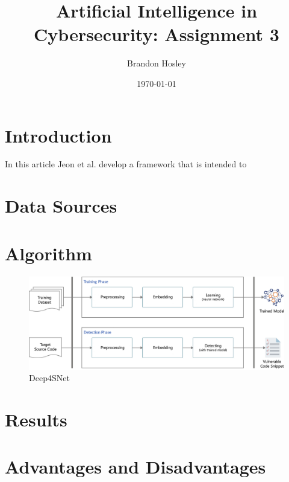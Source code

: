 \documentclass[]{article}
\title{Artificial Intelligence in Cybersecurity: Assignment 3}
\author{Brandon Hosley}
\date{\today}
\begin{document}
	\maketitle
	
\section{Introduction}

In this article \cite{Jeon2021} Jeon et al. develop a framework that is intended to 


\section{Data Sources}



\section{Algorithm}



\begin{figure}[h]
	\centering
	\includegraphics[width=\textwidth]{Algorithm}
	\caption{Deep4SNet \cite{Jeon2021}}
\end{figure}


\section{Results}



\section{Advantages and Disadvantages}
\end{document}
